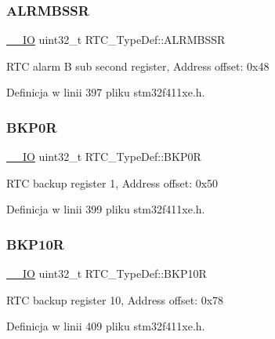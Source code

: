 \subsubsection{\texorpdfstring{A\+L\+R\+M\+B\+S\+SR}{ALRMBSSR}}
{\footnotesize\ttfamily \hyperlink{core__sc300_8h_aec43007d9998a0a0e01faede4133d6be}{\+\_\+\+\_\+\+IO} uint32\+\_\+t R\+T\+C\+\_\+\+Type\+Def\+::\+A\+L\+R\+M\+B\+S\+SR}

R\+TC alarm B sub second register, Address offset\+: 0x48 

Definicja w linii 397 pliku stm32f411xe.\+h.

\mbox{\label{struct_r_t_c___type_def_ab32c76ca1f3bd0f0f46d42c2dfa74524}} 
\subsubsection{\texorpdfstring{B\+K\+P0R}{BKP0R}}
{\footnotesize\ttfamily \hyperlink{core__sc300_8h_aec43007d9998a0a0e01faede4133d6be}{\+\_\+\+\_\+\+IO} uint32\+\_\+t R\+T\+C\+\_\+\+Type\+Def\+::\+B\+K\+P0R}

R\+TC backup register 1, Address offset\+: 0x50 

Definicja w linii 399 pliku stm32f411xe.\+h.

\mbox{\label{struct_r_t_c___type_def_a5feba3d5adae3f234b3d172459163c5a}} 
\subsubsection{\texorpdfstring{B\+K\+P10R}{BKP10R}}
{\footnotesize\ttfamily \hyperlink{core__sc300_8h_aec43007d9998a0a0e01faede4133d6be}{\+\_\+\+\_\+\+IO} uint32\+\_\+t R\+T\+C\+\_\+\+Type\+Def\+::\+B\+K\+P10R}

R\+TC backup register 10, Address offset\+: 0x78 

Definicja w linii 409 pliku stm32f411xe.\+h.

\mbox{\label{struct_r_t_c___type_def_a8fef38e1e122778601e18f5b757c037a}} 
